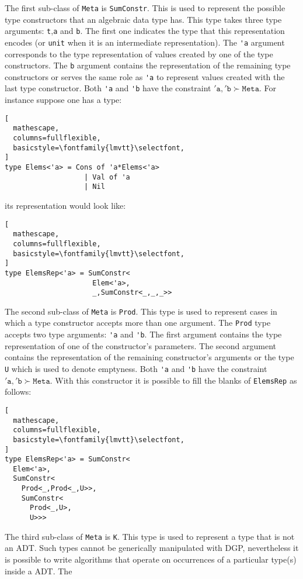 \documentclass{sigplanconf}
\begin{document}
The first sub-class of \verb+Meta+ is \verb+SumConstr+. This is used
to represent the possible type constructors that an algebraic data
type has. This type takes three type arguments: \verb+t+,\verb+a+ and
\verb+b+. The first one indicates the type that this representation
encodes (or \verb+unit+ when it is an intermediate
representation). The \verb+'a+ argument corresponds to the type
representation of values created by one of the type constructors. The
\verb+b+ argument contains the representation of the remaining type
constructors or serves the same role as \verb+'a+ to represent values
created with the last type constructor. Both \verb+'a+ and \verb+'b+
have the constraint $\mathtt{'a},\mathtt{'b} \succ \mathtt{Meta}$. For
instance suppose one has a type:
\begin{lstlisting}[
  mathescape,
  columns=fullflexible,
  basicstyle=\fontfamily{lmvtt}\selectfont,
]
type Elems<'a> = Cons of 'a*Elems<'a> 
                   | Val of 'a 
                   | Nil 
\end{lstlisting}
its representation would look like:
\begin{lstlisting}[
  mathescape,
  columns=fullflexible,
  basicstyle=\fontfamily{lmvtt}\selectfont,
]
type ElemsRep<'a> = SumConstr<
                     Elem<'a>,
                     _,SumConstr<_,_,_>>
\end{lstlisting}
The second sub-class of \verb+Meta+ is \verb+Prod+. This type is used
to represent cases in which a type constructor accepts more than one
argument. The \verb+Prod+ type accepts two type arguments: \verb+'a+
and \verb+'b+. The first argument contains the type representation of
one of the constructor's parameters. The second argument contains the
representation of the remaining constructor's arguments or the type
\verb+U+ which is used to denote emptyness. Both \verb+'a+ and
\verb+'b+ have the constraint $\mathtt{'a},\mathtt{'b} \succ
\mathtt{Meta}$. With this constructor it is possible to fill the
blanks of \verb+ElemsRep+ as follows:
\begin{lstlisting}[
  mathescape,
  columns=fullflexible,
  basicstyle=\fontfamily{lmvtt}\selectfont,
]
type ElemsRep<'a> = SumConstr<
  Elem<'a>,
  SumConstr<
    Prod<_,Prod<_,U>>,
    SumConstr<
      Prod<_,U>,
      U>>>
\end{lstlisting}
The third sub-class of \verb+Meta+ is \verb+K+. This type is used to
represent a type that is not an ADT. Such types cannot be generically
manipulated with DGP, nevertheless it is possible to write algorithms
that operate on occurrences of a particular type(s) inside a ADT. The
\end{document}
